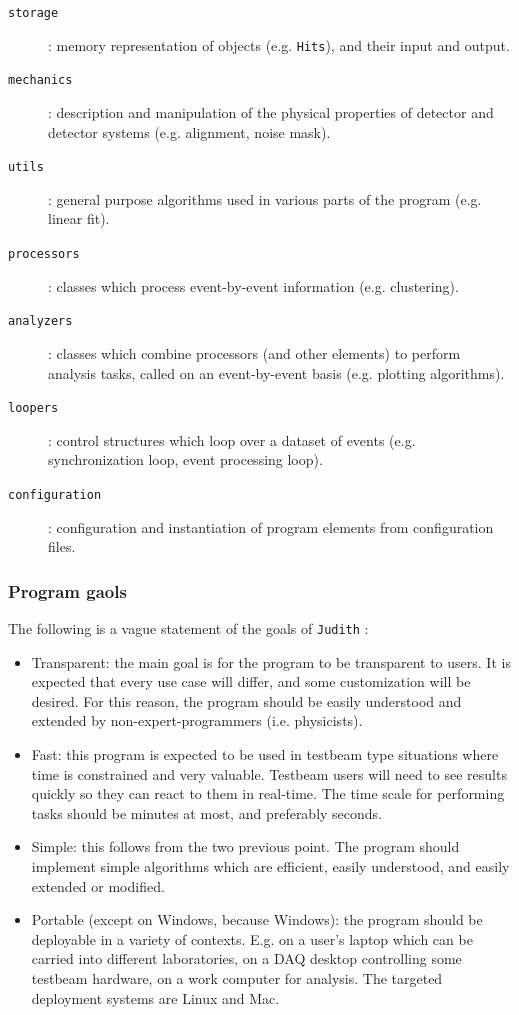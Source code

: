 \documentclass[10pt,a4paper]{book}
\newcommand{\Judith}{\Verb`Judith` }
\begin{document}
\begin{description}
	\item[\Verb`storage`]: memory representation of objects (e.g. \Verb`Hits`), and their input and output.
	\item[\Verb`mechanics`]: description and manipulation of the physical properties of detector and detector systems (e.g. alignment, noise mask).
	\item[\Verb`utils`]: general purpose algorithms used in various parts of the program (e.g. linear fit).
	\item[\Verb`processors`]: classes which process event-by-event information (e.g. clustering).
	\item[\Verb`analyzers`]: classes which combine processors (and other elements) to perform analysis tasks, called on an event-by-event basis (e.g. plotting algorithms).
	\item[\Verb`loopers`]: control structures which loop over a dataset of events (e.g. synchronization loop, event processing loop).
	\item[\Verb`configuration`]: configuration and instantiation of program elements from configuration files.
\end{description}

\subsubsection*{Program gaols}

The following is a vague statement of the goals of \Judith:

\begin{itemize}
	\item Transparent: the main goal is for the program to be transparent to users. It is expected that every use case will differ, and some customization will be desired. For this reason, the program should be easily understood and extended by non-expert-programmers (i.e. physicists).
	\item Fast: this program is expected to be used in testbeam type situations where time is constrained and very valuable. Testbeam users will need to see results quickly so they can react to them in real-time. The time scale for performing tasks should be minutes at most, and preferably seconds.
	\item Simple: this follows from the two previous point. The program should implement simple algorithms which are efficient, easily understood, and easily extended or modified.
	\item Portable (except on Windows, because Windows): the program should be deployable in a variety of contexts. E.g. on a user's laptop which can be carried into different laboratories, on a DAQ desktop controlling some testbeam hardware, on a work computer for analysis. The targeted deployment systems are Linux and Mac.
\end{itemize}
\end{document}
